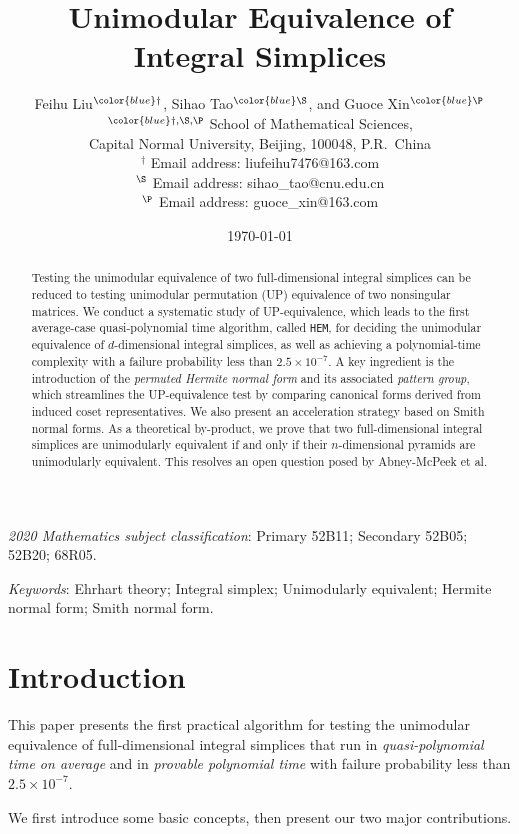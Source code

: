 \documentclass[reqno, 12pt]{article}
\title{Unimodular Equivalence of Integral Simplices}
\author{Feihu Liu$^{\color{blue} \dag}$, Sihao Tao$^{\color{blue} \S}$, and Guoce Xin$^{\color{blue} \P}$
\\[2mm]
{\small $^{\color{blue} \dag, \S, \P}$ School of Mathematical Sciences,}\\[-0.8ex]
{\small Capital Normal University, Beijing, 100048, P.R.~China}\\
{\small {\color{blue} $^\dag$} Email address: liufeihu7476@163.com}\\
{\small {\color{blue} $^\S$} Email address: sihao\_tao@cnu.edu.cn}\\
{\small {\color{blue} $^\P$} Email address: guoce\_xin@163.com}
}
\date{\today}
\theoremstyle{mydefinition}
\theoremstyle{myremark}
\numberwithin{algorithm}{section}
\begin{document}
\maketitle


\begin{abstract}
Testing the unimodular equivalence of two full-dimensional integral simplices can be reduced to testing unimodular permutation (UP) equivalence of two nonsingular matrices. We conduct a systematic study of UP-equivalence, which leads to the first average-case quasi-polynomial time algorithm, called \texttt{HEM}, for deciding the unimodular equivalence of $d$-dimensional integral simplices, as well as achieving a polynomial-time complexity with a failure probability less than $2.5 \times 10^{-7}$.
A key ingredient is the introduction of the \emph{permuted Hermite normal form} and its associated \emph{pattern group}, which streamlines the UP-equivalence test by comparing canonical forms derived from induced coset representatives. We also present an acceleration strategy based on Smith normal forms.
As a theoretical by-product, we prove that two full-dimensional integral simplices are unimodularly equivalent if and only if their $n$-dimensional pyramids are unimodularly equivalent. This resolves an open question posed by Abney-McPeek et al.
\end{abstract}


\noindent
\begin{small}
\emph{2020 Mathematics subject classification}: Primary 52B11; Secondary 52B05; 52B20; 68R05.
\end{small}

\noindent
\begin{small}
\emph{Keywords}: Ehrhart theory; Integral simplex; Unimodularly equivalent; Hermite normal form; Smith normal form.
\end{small}

\tableofcontents

\section{Introduction}\label{sec:intro}
This paper presents the first practical algorithm for testing the unimodular equivalence of
full-dimensional integral simplices that run in \emph{quasi-polynomial time on
average} and in \emph{provable polynomial time} with failure probability less than
$2.5\times 10^{-7}$. 

We first introduce some basic concepts, then present our two major contributions.
\end{document}
